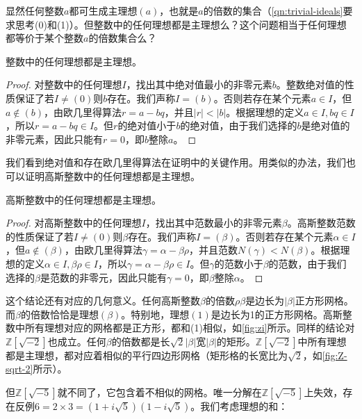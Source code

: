 \documentclass[b5paper]{ctexart}
\begin{document}
显然任何整数$a$都可生成主理想$(a)$，也就是$a$的倍数的集合（\cref{qn:trivial-ideals}要求思考(0)和(1)）。但整数中的任何理想都是主理想么？这个问题相当于任何理想都等价于某个整数$a$的倍数集合么？

\begin{proposition}
整数中的任何理想都是主理想。
\end{proposition}

\begin{proof}
对整数中的任何理想$I$，找出其中绝对值最小的非零元素$b$。整数绝对值的性质保证了若$I \ne (0)$则$b$存在。我们声称$I = (b)$。否则若存在某个元素$a \in I$，但$a \notin (b)$，由欧几里得算法$r = a - bq$，并且$|r| < |b|$。根据理想的定义$a \in I, bq \in I$，所以$r = a - bq \in I$。但$r$的绝对值小于$b$的绝对值，由于我们选择的$b$是绝对值的非零元素，因此只能有$r = 0$，即$b$整除$a$。
\end{proof}

我们看到绝对值和存在欧几里得算法在证明中的关键作用。用类似的办法，我们也可以证明高斯整数中的任何理想都是主理想。

\begin{proposition}
高斯整数中的任何理想都是主理想。
\end{proposition}

\begin{proof}
对高斯整数中的任何理想$I$，找出其中范数最小的非零元素$\beta$。高斯整数范数的性质保证了若$I \ne (0)$则$\beta$存在。我们声称$I = (\beta)$。否则若存在某个元素$\alpha \in I$，但$a \notin (\beta)$，由欧几里得算法$\gamma = \alpha - \beta \rho$，并且范数$N(\gamma) < N(\beta)$。根据理想的定义$\alpha \in I, \beta \rho \in I$，所以$\gamma = \alpha - \beta \rho \in I$。但$\gamma$的范数小于$\beta$的范数，由于我们选择的$\beta$是范数的非零元，因此只能有$\gamma = 0$，即$\beta$整除$\alpha$。
\end{proof}

这个结论还有对应的几何意义。任何高斯整数$\beta$的倍数$\rho \beta$是边长为$|\beta|$正方形网格。而$\beta$的倍数恰恰是理想$(\beta)$。特别地，理想$(1)$是边长为1的正方形网格。高斯整数中所有理想对应的网格都是正方形，都和(1)相似，如\cref{fig:zi}所示。同样的结论对$\mathbb{Z}[\sqrt{-2}]$也成立。任何$\beta$的倍数都是长$\sqrt{2}|\beta|$宽$|\beta|$的矩形。$\mathbb{Z}[\sqrt{-2}]$中所有理想都是主理想，都对应着相似的平行四边形网格（矩形格的长宽比为$\sqrt{2}$，如\cref{fig:Z-sqrt-2}所示）。

但$\mathbb{Z}[\sqrt{-5}]$就不同了，它包含着不相似的网格。唯一分解在$\mathbb{Z}[\sqrt{-5}]$上失效，存在反例$6 = 2 \times 3 = (1 + i\sqrt{5})(1 - i\sqrt{5})$。我们考虑理想的和：
\end{document}
